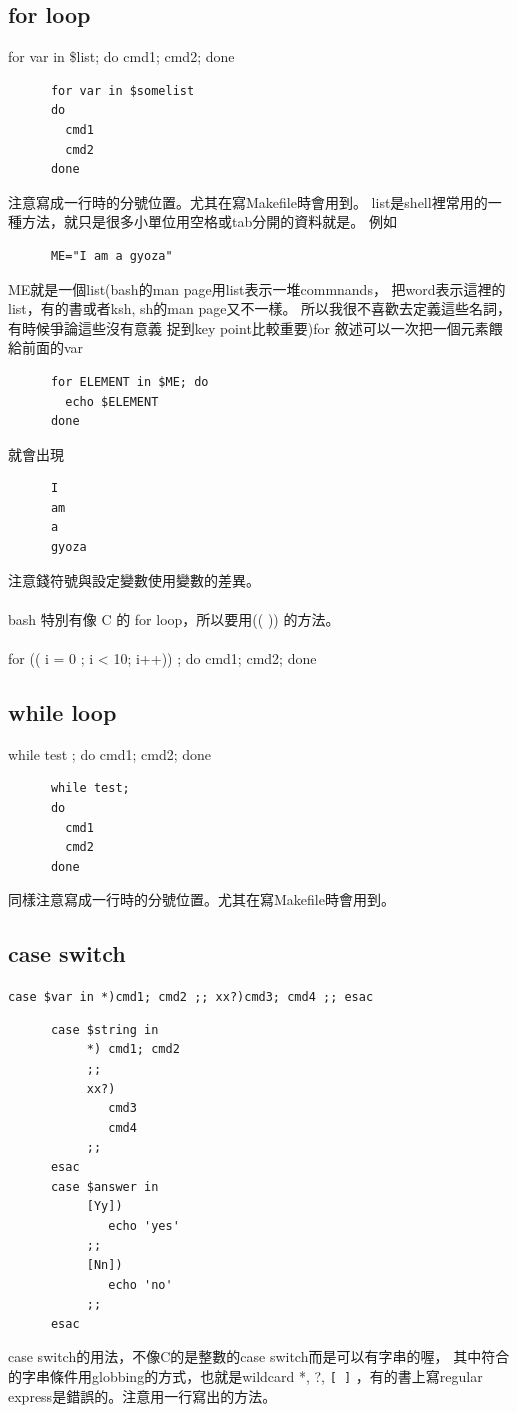     \subsection{for loop}
    for var in \$list; do cmd1; cmd2; done
    \begin{verbatim}
      for var in $somelist
      do
        cmd1
        cmd2
      done
    \end{verbatim}
    注意寫成一行時的分號位置。尤其在寫Makefile時會用到。
    list是shell裡常用的一種方法，就只是很多小單位用空格或tab分開的資料就是。
    例如
    \begin{verbatim}
      ME="I am a gyoza"
    \end{verbatim}
    ME就是一個list(bash的man page用list表示一堆commnands，
    把word表示這裡的list，有的書或者ksh, sh的man page又不一樣。
    所以我很不喜歡去定義這些名詞，有時候爭論這些沒有意義
    捉到key point比較重要)for 敘述可以一次把一個元素餵給前面的var
    \begin{verbatim}
      for ELEMENT in $ME; do
        echo $ELEMENT
      done
    \end{verbatim}
    就會出現
    \begin{verbatim}
      I
      am
      a
      gyoza
    \end{verbatim}
    注意錢符號與設定變數使用變數的差異。
    \\\\
    bash 特別有像 C 的 for loop，所以要用(( )) 的方法。
    \\\\
    for (( i = 0 ; i < 10; i++)) ; do cmd1; cmd2; done
    \subsection{while loop}
    while test ; do cmd1; cmd2; done
    \begin{verbatim}
      while test;
      do
        cmd1
        cmd2
      done
    \end{verbatim}
    同樣注意寫成一行時的分號位置。尤其在寫Makefile時會用到。

    \subsection{case switch}
    \verb=case $var in *)cmd1; cmd2 ;; xx?)cmd3; cmd4 ;; esac=
    \begin{verbatim}
      case $string in 
           *) cmd1; cmd2
           ;;
           xx?)
              cmd3
              cmd4
           ;;
      esac
      case $answer in
           [Yy])
              echo 'yes'
           ;;
           [Nn])
              echo 'no'
           ;;
      esac
    \end{verbatim}
    case switch的用法，不像C的是整數的case switch而是可以有字串的喔，
    其中符合的字串條件用globbing的方式，也就是wildcard *, ?, \verb=[ ]=
    ，有的書上寫regular express是錯誤的。注意用一行寫出的方法。

